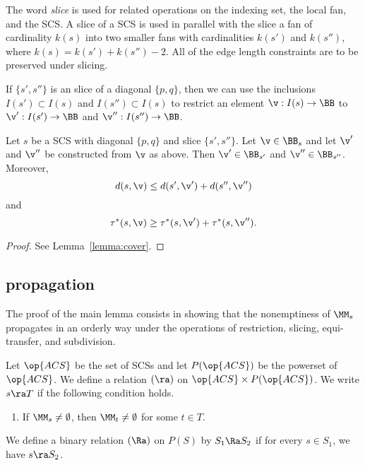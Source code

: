 The word {\it slice} is used for related operations on the indexing
set, the local fan, and the SCS.  A slice of a
SCS is used in parallel with the slice a fan of
cardinality $k(s)$ into two smaller fans with cardinalities $k(s')$ and
$k(s'')$, where $k(s)=k(s')+k(s'')-2$.  
All of the edge length constraints are to be preserved
under slicing.  

If $\{s',s''\}$ is an slice of a diagonal $\{p,q\}$, then we can use
the inclusions $I(s')\subset I(s)$ and $I(s'')\subset I(s)$ to
restrict an element $\v:I(s)\to\BB$ to $\v':I(s')\to \BB$ and
$\v'':I(s'')\to \BB$.  

\begin{lemma}\label{lemma:cover2}
Let $s$ be a SCS with diagonal $\{p,q\}$ and slice
 $\{s',s''\}$. 
Let $\v\in \BB_s$ and let $\v'$ and $\v''$ be constructed from $\v$ as above.
Then  $\v'\in \BB_{s'}$ and $\v''\in \BB_{s''}$.
Moreover,
\begin{equation}
d(s,\v) \le d(s',\v') + d(s'',\v'')
\end{equation}
and
\begin{equation}
\tau^*(s,\v)\ge \tau^*(s,\v')+\tau^*(s,\v'').
\end{equation}
\end{lemma}

\begin{proof} See Lemma~\ref{lemma:cover}.
\end{proof}

\subsection{propagation}

The proof of the main lemma consists in showing that the nonemptiness
of $\MM_s$ propagates in an orderly way under the operations of
restriction, slicing, equi-transfer, and subdivision.

\begin{definition}[$\ra$~$\Ra$] 
Let $\op{ACS}$ be the set of SCSs
and let $P(\op{ACS})$ be the powerset of $\op{ACS}$. 
 We define a relation $(\ra)$ on $\op{ACS}\times P(\op{ACS})$.
We write $s\ra T$ if the following condition holds.
\begin{enumerate}
\item If $\MM_s\ne\emptyset$, then 
$\MM_t\ne\emptyset$ for some $t\in T$.
\end{enumerate}
We define a binary relation $(\Ra)$ on $P(S)$ by
$S_1\Ra S_2$ if for every $s\in S_1$, we have $s\ra S_2$.
\end{definition}

